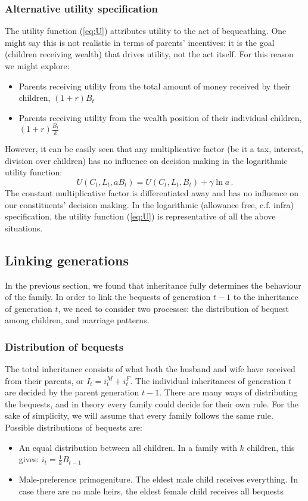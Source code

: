 \subsubsection{Alternative utility specification}
\label{sss:alt-utility}
The utility function (\ref{eq:U}) attributes utility to the act of bequeathing. One might say this is not realistic in terms of parents' incentives: it is the goal (children receiving wealth) that drives utility, not the act itself. For this reason we might explore:
\begin{itemize}
    \item Parents receiving utility from the total amount of money received by their children, $(1+r)B_t$
    \item Parents receiving utility from the wealth position of their individual children, $(1+r)\frac{B_t}{k}$ 
\end{itemize}
However, it can be easily seen that any multiplicative factor (be it a tax, interest, division over children) has no influence on decision making in the logarithmic utility function:
\begin{equation}
    U(C_t,L_t,a B_t) = U(C_t,L_t,B_t) + \gamma \ln a\,.
\end{equation}
The constant multiplicative factor is differentiated away and has no influence on our constituents' decision making. In the logarithmic (allowance free, c.f. infra) specification, the utility function (\ref{eq:U}) is representative of all the above situations. 

\subsection{Linking generations}
In the previous section, we found that inheritance fully determines the behaviour of the family. In order to link the bequests of generation $t-1$ to the inheritance of generation $t$, we need to consider two processes: the distribution of bequest among children, and marriage patterns.

\subsubsection{Distribution of bequests}
The total inheritance consists of what both the husband and wife have received from their parents, or $I_t = i^M_t + i^F_t$. The individual inheritances of generation $t$ are decided by the parent generation $t-1$. There are many ways of distributing the bequests, and in theory every family could decide for their own rule. For the sake of simplicity, we will assume that every family follows the same rule. Possible distributions of bequests are:
\begin{itemize}
\item An equal distribution between all children. In a family with $k$ children, this gives: $i_t = \frac{1}{k}B_{t-1}$
    \item Male-preference primogeniture. The eldest male child receives everything. In case there are no male heirs, the eldest female child receives all bequests
\end{itemize}




